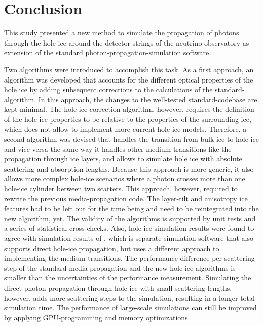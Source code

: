 
\section{Conclusion}
\label{sec:conclusion}

This study presented a new method to simulate the propagation of photons through the hole ice around the detector strings of the \icecube neutrino observatory as extension of the standard \clsim photon-propagation-simulation software.

Two algorithms were introduced to accomplish this task.
As a first approach, an algorithm was developed that accounts for the different optical properties of the hole ice by adding subsequent corrections to the calculations of the standard-\clsim algorithm.
In this approach, the changes to the well-tested standard-\clsim codebase are kept minimal.
The hole-ice-correction algorithm, however, requires the definition of the hole-ice properties to be relative to the properties of the surrounding ice, which does not allow to implement more current hole-ice models.
Therefore, a second algorithm was devised that handles the transition from bulk ice to hole ice and vice versa the same way it handles other medium transitions like the propagation through ice layers, and allows to simulate hole ice with absolute scattering and absorption lengths.
Because this approach is more generic, it also allows more complex hole-ice scenarios where a photon crosses more than one hole-ice cylinder between two scatters.
This approach, however, required to rewrite the previous \clsim media-propagation code.
The layer-tilt and anisotropy ice features had to be left out for the time being and need to be reintegrated into the new algorithm, yet.
The validity of the algorithms is supported by unit tests and a series of statistical cross checks.
Also, \clsim hole-ice simulation results were found to agree with simulation results of \ppc, which is separate \icecube simulation software that also supports direct hole-ice propagation, but uses a different approach to implementing the medium transitions.
The performance difference per scattering step of the standard-\clsim media propagation and the new hole-ice algorithms is smaller than the uncertainties of the performance measurement.
Simulating the direct photon propagation through hole ice with small scattering lengths, however, adds more scattering steps to the simulation, resulting in a longer total simulation time.
The performance of large-scale simulations can still be improved by applying GPU-programming and memory optimizations.

